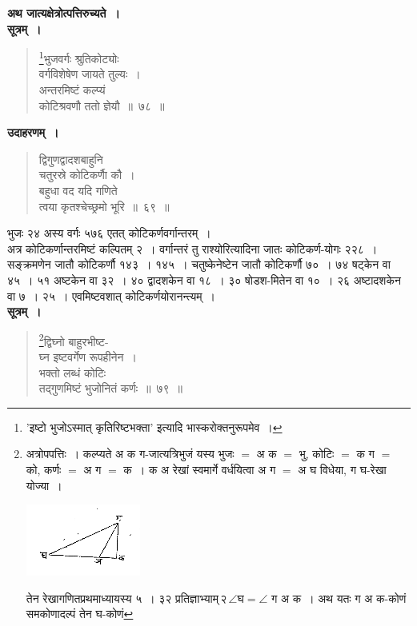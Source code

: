 \documentclass[11pt, openany]{book}
\begin{document}
\textbf{अथ जात्यक्षेत्रोत्पत्तिरुच्यते~।} \\

\vspace{-2mm}
\textbf{सूत्रम्~।} 
\begin{quote}
    \bs 
     \footnote{'{\color{violet}इष्टो भुजोऽस्मात् कृतिरिष्टभक्ता}' इत्यादि {\color{violet}भास्करो}क्तनुरूपमेव~।}भुजवर्गः श्रुतिकोट्योः\\
     वर्गविशेषेण जायते तुल्यः~।\\
अन्तरमिष्टं कल्प्यं \\
कोटिश्रवणौ ततो ज्ञेयौ~॥~७८~॥
\end{quote}

 \textbf{उदाहरणम्~।} 
\begin{quote}
    \bqt 
द्विगुणद्वादशबाहुनि \\
चतुरस्रे कोटिकर्णाै कौ~।\\
बहुधा वद यदि गणिते \\
त्वया कृतश्चेच्छ्रमो भूरि~॥~६९~॥
\end{quote}

\newpage%

 भुजः २४ अस्य वर्गः ५७६ एतत् कोटिकर्णवर्गान्तरम्~। \\

\vspace{-3mm}
 अत्र कोटिकर्णान्तरमिष्टं कल्पितम् २~। वर्गान्तरं तु राश्योरित्यादिना
जातः कोटिकर्ण-योगः २२८~। सङ्क्रमणेन जातौ कोटिकर्णौ १४३~। १४५~। 
चतुष्केनेष्टेन जातौ कोटिकर्णौ ७०~। ७४ षट्केन वा ४५~। ५१ अष्टकेन वा
३२~। ४० द्वादशकेन वा १८~। ३० षोडश-मितेन वा १०~। २६ अष्टादशकेन वा ७~। २५~। एवमिष्टवशात् कोटिकर्णयोरानन्त्यम्~। \\

 \textbf{सूत्रम्~।} 
\begin{quote}
    \bs 
    \footnote{अत्रोपपत्तिः~। कल्प्यते अ क ग-जात्यत्रिभुजं यस्य भुजः $=$ अ क $=$ भु, कोटिः $=$ क ग $=$ को, कर्णः $=$ अ ग $=$ क~। क अ रेखां स्वमार्गे वर्धयित्वा अ ग $=$ अ घ विधेया, ग घ-रेखा योज्या~। 
    \vspace{-4mm}
    
\begin{center}
    \includegraphics[scale=0.85]{graphics/capture99.png}
\end{center}
    \vspace{-4mm}

\noindent तेन रेखागणितप्रथमाध्यायस्य ५~। ३२ प्रतिज्ञाभ्याम्\textendash \,२\,$\angle \mbox{घ} = \angle$ ग अ क~। अथ यतः ग अ क-कोणं समकोणादल्पं तेन घ-कोणं}द्विघ्नो बाहुरभीष्ट-\\
घ्न इष्टवर्गेण रूपहीनेन~।\\
भक्तो लब्धं कोटिः\\
तद्गुणमिष्टं भुजोनितं कर्णः~॥~७९~॥
\end{quote}
\newpage%
\end{document}
